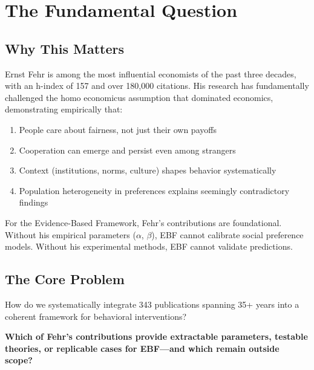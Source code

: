 \section{The Fundamental Question}
\label{sec:feh-fundamental}

\subsection{Why This Matters}

Ernst Fehr is among the most influential economists of the past three decades,
with an h-index of 157 and over 180,000 citations. His research has fundamentally
challenged the homo economicus assumption that dominated economics, demonstrating
empirically that:

\begin{enumerate}
    \item People care about fairness, not just their own payoffs
    \item Cooperation can emerge and persist even among strangers
    \item Context (institutions, norms, culture) shapes behavior systematically
    \item Population heterogeneity in preferences explains seemingly contradictory findings
\end{enumerate}

For the Evidence-Based Framework, Fehr's contributions are foundational. Without
his empirical parameters ($\alpha$, $\beta$), EBF cannot calibrate social preference
models. Without his experimental methods, EBF cannot validate predictions.

\subsection{The Core Problem}

How do we systematically integrate 343 publications spanning 35+ years into a
coherent framework for behavioral interventions?

\begin{tcolorbox}[colback=red!5!white, colframe=red!75!black,
    title=The Fundamental Question]
\textbf{Which of Fehr's contributions provide extractable parameters, testable
theories, or replicable cases for EBF---and which remain outside scope?}
\end{tcolorbox}


